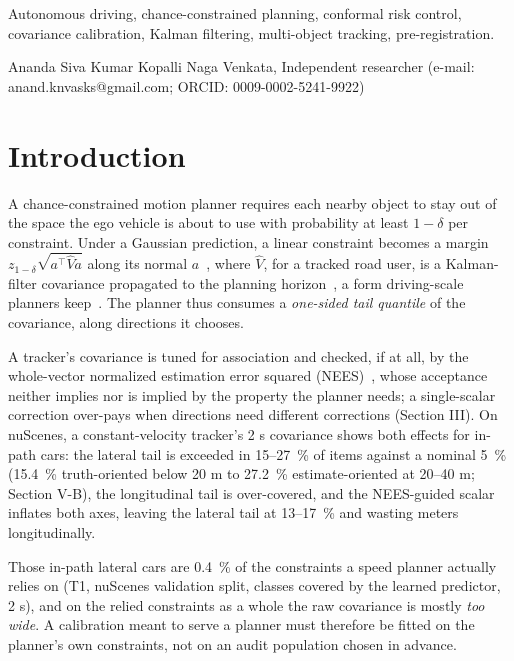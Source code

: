 \documentclass{ieeeaccess}
\begin{document}
\begin{keywords}
Autonomous driving, chance-constrained planning, conformal risk control, covariance calibration, Kalman filtering, multi-object tracking, pre-registration.
\end{keywords}

\titlepgskip=-21pt

\maketitle

Ananda Siva Kumar Kopalli Naga Venkata, Independent researcher (e-mail: anand.knvasks@gmail.com; ORCID: 0009-0002-5241-9922)

\section{Introduction}
\label{sec:introduction}
A chance-constrained motion planner requires each nearby object to stay out of the space the ego vehicle is about to use with probability at least $1 - \delta$ per constraint. Under a Gaussian prediction, a linear constraint becomes a margin $z_{1-\delta}\sqrt{a^{\top}\hat{V}a}$ along its normal $a$~\cite{Blackmore2011,Ono2008}, where $\hat{V}$, for a tracked road user, is a Kalman-filter covariance propagated to the planning horizon~\cite{Zhu2019}, a form driving-scale planners keep~\cite{Nair2025,Ren2025}. The planner thus consumes a \emph{one-sided tail quantile} of the covariance, along directions it chooses.

A tracker's covariance is tuned for association and checked, if at all, by the whole-vector normalized estimation error squared (NEES)~\cite{BarShalom2001,Osterburg2026}, whose acceptance neither implies nor is implied by the property the planner needs; a single-scalar correction over-pays when directions need different corrections (Section III). On nuScenes, a constant-velocity tracker's 2 s covariance shows both effects for in-path cars: the lateral tail is exceeded in 15--27~\% of items against a nominal 5~\% (15.4~\% truth-oriented below 20 m to 27.2~\% estimate-oriented at 20--40 m; Section V-B), the longitudinal tail is over-covered, and the NEES-guided scalar inflates both axes, leaving the lateral tail at 13--17~\% and wasting meters longitudinally.

Those in-path lateral cars are 0.4~\% of the constraints a speed planner actually relies on (T1, nuScenes validation split, classes covered by the learned predictor, 2 s), and on the relied constraints as a whole the raw covariance is mostly \emph{too wide}. A calibration meant to serve a planner must therefore be fitted on the planner's own constraints, not on an audit population chosen in advance.
\end{document}
